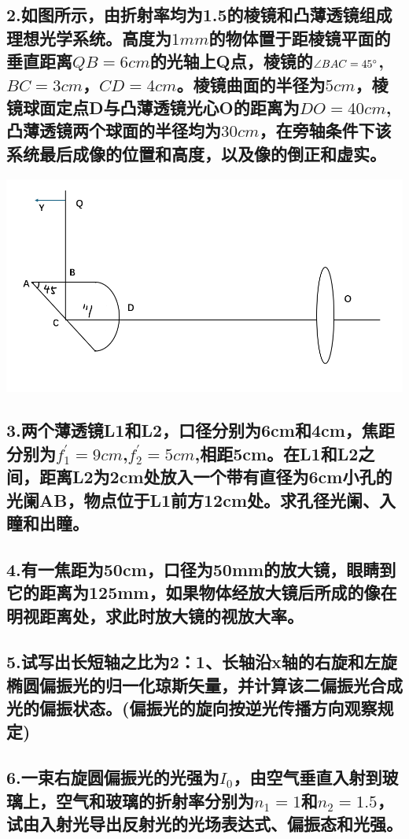 \documentclass[11pt,a4paper]{article}
\begin{document}
    \subsection*{2.如图所示，由折射率均为1.5的棱镜和凸薄透镜组成理想光学系统。高度为$1mm$的物体置于距棱镜平面的垂直距离$QB=6cm$的光轴上Q点，棱镜的$\angle BAC=45\degree$,$BC=3cm$，$CD=4cm$。棱镜曲面的半径为$5cm$，棱镜球面定点D与凸薄透镜光心O的距离为$DO=40cm$,凸薄透镜两个球面的半径均为$30cm$，在旁轴条件下该系统最后成像的位置和高度，以及像的倒正和虚实。}
    \includegraphics[scale=0.2]{1.png}%
    \vspace{10mm}
    \subsection*{3.两个薄透镜L1和L2，口径分别为6cm和4cm，焦距分别为$f_{1}^{'}=9cm$,$f_{2}^{'}=5cm$,相距5cm。在L1和L2之间，距离L2为2cm处放入一个带有直径为6cm小孔的光阑AB，物点位于L1前方12cm处。求孔径光阑、入瞳和出瞳。}
    \vspace{10mm}
    \subsection*{4.有一焦距为50cm，口径为50mm的放大镜，眼睛到它的距离为125mm，如果物体经放大镜后所成的像在明视距离处，求此时放大镜的视放大率。}
    \vspace{10mm}
    \subsection*{5.试写出长短轴之比为2：1、长轴沿x轴的右旋和左旋椭圆偏振光的归一化琼斯矢量，并计算该二偏振光合成光的偏振状态。(偏振光的旋向按逆光传播方向观察规定)}
    \vspace{10mm}
    \subsection*{6.一束右旋圆偏振光的光强为$I_{0}$，由空气垂直入射到玻璃上，空气和玻璃的折射率分别为$n_1=1$和$n_2=1.5$，试由入射光导出反射光的光场表达式、偏振态和光强。}
    \vspace{10mm}
\end{document}
